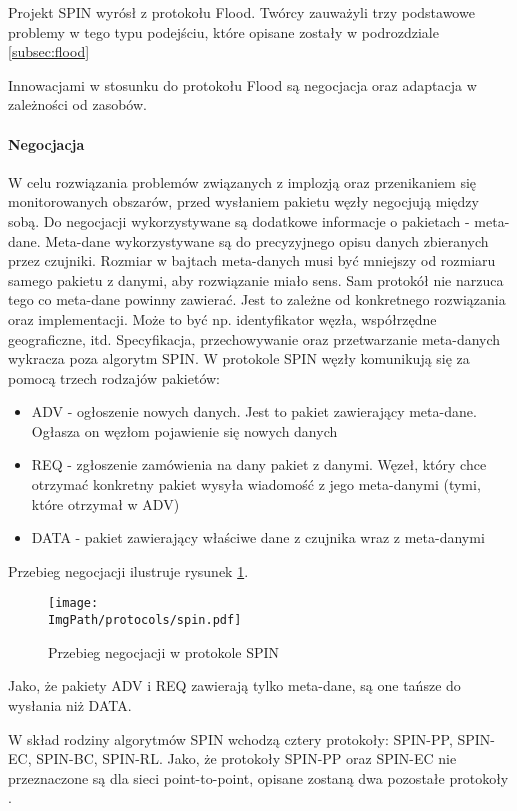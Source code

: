 Projekt SPIN wyrósł z protokołu Flood. Twórcy zauważyli trzy podstawowe problemy w tego typu podejściu, które opisane zostały w podrozdziale \ref{subsec:flood}

Innowacjami w stosunku do protokołu Flood są negocjacja oraz adaptacja w zależności od zasobów.

\paragraph{Negocjacja} W celu rozwiązania problemów związanych z implozją oraz przenikaniem się monitorowanych obszarów, przed wysłaniem pakietu węzły negocjują między sobą. Do negocjacji wykorzystywane są dodatkowe informacje o pakietach - meta-dane. 
Meta-dane wykorzystywane są do precyzyjnego opisu danych zbieranych przez czujniki. Rozmiar w bajtach meta-danych musi być mniejszy od rozmiaru samego pakietu z danymi, aby rozwiązanie miało sens.
Sam protokół nie narzuca tego co meta-dane powinny zawierać. Jest to zależne od konkretnego rozwiązania oraz implementacji. Może to być np. identyfikator węzła, współrzędne geograficzne, itd. Specyfikacja, przechowywanie oraz przetwarzanie meta-danych wykracza poza algorytm SPIN.
W protokole SPIN węzły komunikują się za pomocą trzech rodzajów pakietów:
\begin{itemize}
	\item ADV - ogłoszenie nowych danych. Jest to pakiet zawierający meta-dane. Ogłasza on węzłom pojawienie się nowych danych
	\item REQ - zgłoszenie zamówienia na dany pakiet z danymi. Węzeł, który chce otrzymać konkretny pakiet wysyła wiadomość z jego meta-danymi (tymi, które otrzymał w ADV)
	\item DATA - pakiet zawierający właściwe dane z czujnika wraz z meta-danymi
\end{itemize}
Przebieg negocjacji ilustruje rysunek \ref{fig:spin}.
\begin{figure}[H]
	\label{fig:spin}
	\begin{center}
		\texttt{[image: \\ImgPath/protocols/spin.pdf]}
	\end{center}
	\caption{Przebieg negocjacji w protokole SPIN}
\end{figure}

Jako, że pakiety ADV i REQ zawierają tylko meta-dane, są one tańsze do wysłania niż DATA.

W skład rodziny algorytmów SPIN wchodzą cztery protokoły: SPIN-PP, SPIN-EC, SPIN-BC, SPIN-RL. Jako, że protokoły SPIN-PP oraz SPIN-EC nie przeznaczone są dla sieci point-to-point, opisane zostaną dwa pozostałe protokoły \cite{Dargie2010, Kulik2002}.

